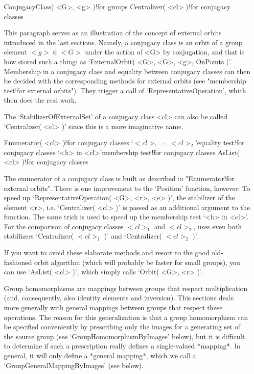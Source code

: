 \null

\>ConjugacyClass( <G>, <g> )!{for groups}
\>Centralizer( <cl> )!{for conjugacy classes}

This paragraph  serves  as an illustration  of  the  concept  of external
orbits introduced in  the last sections. Namely,  a conjugacy class is an
orbit  of a   group  element $<g>\in  <G>$  under  the action  of <G>  by
conjugation,  and   that  is  how    {\GAP}  stored such    a  thing:  as
`ExternalOrbit(  <G>,  <G>, <g>, OnPoints  )'.  Membership in a conjugacy
class and equality between conjugacy classes can then be decided with the
corresponding   methods for  external  orbits   (see "membership test!for
external orbits").  They trigger   a call  of  `RepresentativeOperation',
which then does the real work.

The  `StabilizerOfExternalSet' of  a   conjugacy class <cl>  can also  be
called `Centralizer( <cl> )' since this is a more imaginative name.

\>Enumerator( <cl> )!{for conjugacy classes}
\>`$<cl>_1$ = $<cl>_2$'{equality test}!{for conjugacy classes}
\>`<h> in <cl>'{membership test}!{for conjugacy classes}
\>AsList( <cl> )!{for conjugacy classes}

The  enumerator  of  a    conjugacy class  is  built  as     described in
"Enumerator!for  external orbits".  There   is  one  improvement  to  the
`Position' function,  however: To speed up `RepresentativeOperation( <G>,
<r>, <e>  )', the stabilizer of  the element <r>, i.e. `Centralizer( <cl>
)' is passed as an additional argument to the function. The same trick is
used to speed up the membership test `<h> in <cl>'. For the comparison of
conjugacy  classes  $<cl>_1$ and   $<cl>_2$,    {\GAP}  uses even    both
stabilizers `Centralizer( $<cl>_1$ )' and `Centralizer( $<cl>_2$ )'.

If   you want to avoid these   elaborate methods and  resort  to the good
old-fashioned orbit  algorithm (which will  probably  be faster for small
groups), you can  use `AsList( <cl>  )', which simply calls `Orbit(  <G>,
<r> )'.


Group homomorphisms    are   mappings  between  groups     that   respect
multiplication (and, consequently, also identity elements and inversion).
This sections  deals more generally  with general mappings between groups
that respect these operations. The reason for this generalization is that
a  group homomorphism can be specified  conveniently  by prescribing only
the     images for  a   generating   set    of  the  source   group  (see
`GroupHomomorphismByImages' below),  but it is  difficult to determine if
such a prescription really defines a single-valued *mapping*. In general,
it     will   only define  a     *general  mapping*, which     we  call a
`GroupGeneralMappingByImages' (see below).

